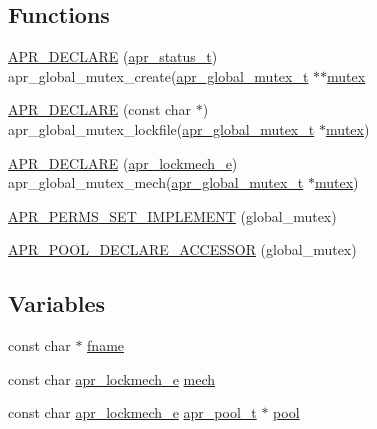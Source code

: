 \subsection*{Functions}
\begin{DoxyCompactItemize}
\item 
\hyperlink{group__APR__GlobalMutex_ga47ced81b7cf255f94aa0c2857abe5300}{A\+P\+R\+\_\+\+D\+E\+C\+L\+A\+RE} (\hyperlink{group__apr__errno_gaa5105fa83cc322f09382292db8b47593}{apr\+\_\+status\+\_\+t}) apr\+\_\+global\+\_\+mutex\+\_\+create(\hyperlink{structapr__global__mutex__t}{apr\+\_\+global\+\_\+mutex\+\_\+t} $\ast$$\ast$\hyperlink{group__apr__thread__cond_ga9b5d997217b2ae4c884c535811cb6e35}{mutex}
\item 
\hyperlink{group__APR__GlobalMutex_gae52583174fa4e71624db3d4e9d617861}{A\+P\+R\+\_\+\+D\+E\+C\+L\+A\+RE} (const char $\ast$) apr\+\_\+global\+\_\+mutex\+\_\+lockfile(\hyperlink{structapr__global__mutex__t}{apr\+\_\+global\+\_\+mutex\+\_\+t} $\ast$\hyperlink{group__apr__thread__cond_ga9b5d997217b2ae4c884c535811cb6e35}{mutex})
\item 
\hyperlink{group__APR__GlobalMutex_gaa07ab7d5b833793b592776b82177e674}{A\+P\+R\+\_\+\+D\+E\+C\+L\+A\+RE} (\hyperlink{group__apr__proc__mutex_ga75dd95a48a1e855a87b509b522746ed4}{apr\+\_\+lockmech\+\_\+e}) apr\+\_\+global\+\_\+mutex\+\_\+mech(\hyperlink{structapr__global__mutex__t}{apr\+\_\+global\+\_\+mutex\+\_\+t} $\ast$\hyperlink{group__apr__thread__cond_ga9b5d997217b2ae4c884c535811cb6e35}{mutex})
\item 
\hyperlink{group__APR__GlobalMutex_ga09b08568c41cec184cf2f4915ecc04e9}{A\+P\+R\+\_\+\+P\+E\+R\+M\+S\+\_\+\+S\+E\+T\+\_\+\+I\+M\+P\+L\+E\+M\+E\+NT} (global\+\_\+mutex)
\item 
\hyperlink{group__APR__GlobalMutex_ga722d0f9777257de10d37d174468bc881}{A\+P\+R\+\_\+\+P\+O\+O\+L\+\_\+\+D\+E\+C\+L\+A\+R\+E\+\_\+\+A\+C\+C\+E\+S\+S\+OR} (global\+\_\+mutex)
\end{DoxyCompactItemize}
\subsection*{Variables}
\begin{DoxyCompactItemize}
\item 
const char $\ast$ \hyperlink{group__APR__GlobalMutex_ga6a2fc0c236288b07ce5bd1335ca89fa2}{fname}
\item 
const char \hyperlink{group__apr__proc__mutex_ga75dd95a48a1e855a87b509b522746ed4}{apr\+\_\+lockmech\+\_\+e} \hyperlink{group__APR__GlobalMutex_ga1e2bd4bf5e9584b52b5fc7d60cc52cb3}{mech}
\item 
const char \hyperlink{group__apr__proc__mutex_ga75dd95a48a1e855a87b509b522746ed4}{apr\+\_\+lockmech\+\_\+e} \hyperlink{structapr__pool__t}{apr\+\_\+pool\+\_\+t} $\ast$ \hyperlink{group__APR__GlobalMutex_ga51fbc0d90e2519e2e42e03c5dd9f441b}{pool}
\end{DoxyCompactItemize}


